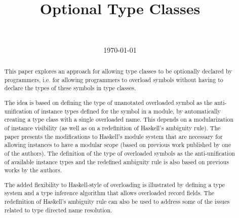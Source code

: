\documentclass{article}
\author{\ }
\title{Optional Type Classes}
\date{\today}
\begin{document}
\maketitle

\begin{abstract}

This paper explores an approach for allowing type classes to be
optionally declared by programmers, i.e. for allowing programmers to
overload symbols without having to declare the types of these symbols
in type classes.

The idea is based on defining the type of unanotated overloaded symbol
as the anti-unification of instance types defined for the symbol in a
module, by automatically creating a type class with a single
overloaded name. This depends on a modularization of instance
visibility (as well as on a redefinition of Haskell's ambiguity rule).
The paper presents the modifications to Haskell's module system that
are necessary for allowing instances to have a modular scope (based on
previous work published by one of the authors). The definition of the
type of overloaded symbols as the anti-unification of available
instance types and the redefined ambiguity rule is also based on
previous works by the authors.

The added flexibility to Haskell-style of overloading is illustrated
by defining a type system and a type inference algorithm that allows
overloaded record fields. The redefinition of Haskell's ambiguity rule
can also be used to address some of the issues related to type
directed name resolution.

\end{abstract}







% 











\end{document}
